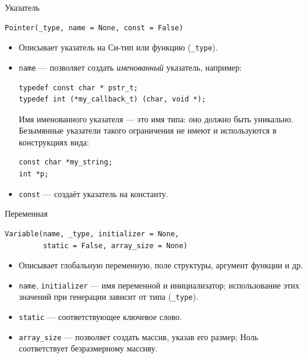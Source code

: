 \documentclass[unicode,hyperref={unicode=true}]{beamer}
\theoremstyle{definition}
\theoremstyle{plain}
\begin{document}
\begin{frame}[fragile]{Указатель}
\lstset{language=Python}
\begin{lstlisting}
Pointer(_type, name = None, const = False)
\end{lstlisting}
\vfill
\begin{itemize}
\item Описывает указатель на Си-тип или функцию (\texttt{\_type}).
\item \texttt{name} --- позволяет создать \textit{именованный} указатель,
    например:\\

\lstset{language=C}
\begin{lstlisting}
typedef const char * pstr_t;
typedef int (*my_callback_t) (char, void *);
\end{lstlisting}

    Имя именованного указателя --- это имя типа: оно должно быть уникально.
    Безымянные указатели такого ограничения не имеют и используются в
    конструкциях вида:

\lstset{language=C}
\begin{lstlisting}
const char *my_string;
int *p;
\end{lstlisting}


\item \texttt{const} --- создаёт указатель на константу.
\end{itemize}
\end{frame}



\begin{frame}[fragile]{Переменная}
\lstset{language=Python}
\begin{lstlisting}
Variable(name, _type, initializer = None,
         static = False, array_size = None)
\end{lstlisting}
\vfill
\begin{itemize}
\item Описывает глобальную переменную, поле структуры, аргумент функции и др.
\item \texttt{name}, \texttt{initializer} --- имя переменной и инициализатор;
    использование этих значений при генерации зависит от типа (\texttt{\_type}).
\item \texttt{static} --- соответствующее ключевое слово.
\item \texttt{array\_size} --- позволяет создать массив, указав его размер;
    Ноль соответствует безразмерному массиву.
\end{itemize}
\end{frame}
\end{document}
